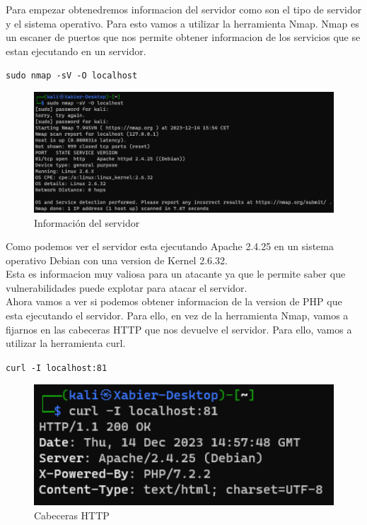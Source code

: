 \documentclass{report}
\begin{document}
                Para empezar obtenedremos informacion del servidor como son el tipo de servidor y el sistema operativo.
                Para esto vamos a utilizar la herramienta Nmap.
                Nmap es un escaner de puertos que nos permite obtener informacion de los servicios que se estan ejecutando en un servidor.
                \begin{center}
                    \texttt{sudo nmap -sV -O localhost}
                \end{center}
                \begin{figure}[H]
                    \centering
                    \includegraphics[width=1\textwidth]{./img/vulnerabilidades/2.4/1.1.png}
                    \caption{Información del servidor}
                \end{figure}
                Como podemos ver el servidor esta ejecutando Apache 2.4.25 en un sistema operativo Debian con una version de Kernel 2.6.32.\\
                Esta es informacion muy valiosa para un atacante ya que le permite saber que vulnerabilidades puede explotar para atacar el servidor.\\
                \clearpage
                Ahora vamos a ver si podemos obtener informacion de la version de PHP que esta ejecutando el servidor.
                Para ello, en vez de la herramienta Nmap, vamos a fijarnos en las cabeceras HTTP que nos devuelve el servidor.
                Para ello, vamos a utilizar la herramienta curl.
                \begin{center}
                    \texttt{curl -I localhost:81}
                \end{center}
                \begin{figure}[H]
                    \centering
                    \includegraphics[width=1\textwidth]{./img/vulnerabilidades/2.4/1.2.png}
                    \caption{Cabeceras HTTP}
                \end{figure}
\end{document}
